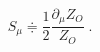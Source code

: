 \begin{equation}
\label{e4:21}
S_{\mu} \doteqdot \frac{1}{2} \frac{\partial_{\mu}Z_O}{Z_O} \; .
\end{equation}

